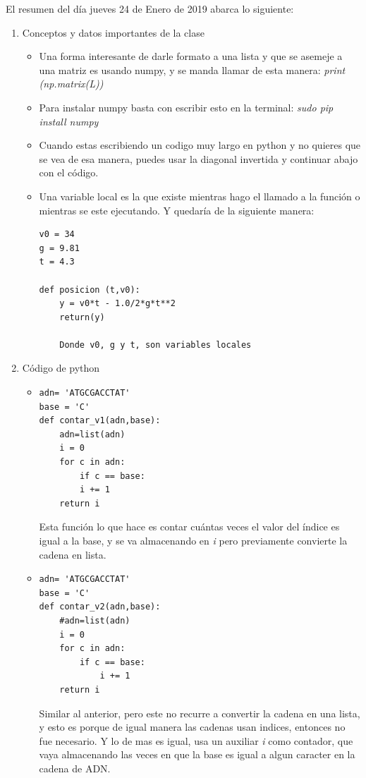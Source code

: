 \documentclass[letterpaper, 12pt,oneside]{article}
\begin{document}
	El resumen del día jueves 24 de Enero de 2019 abarca lo siguiente:
	\begin{enumerate}
		\item Conceptos y datos importantes de la clase
			\begin{itemize}
				\item Una forma interesante de darle formato a una lista y que se asemeje a una matriz es usando numpy, y se manda llamar de esta manera: \textit{print (np.matrix(L))}\\
				

				\item Para instalar numpy basta con escribir esto en la terminal: \textit{sudo pip install numpy}\\
				
				\item Cuando estas escribiendo un codigo muy largo en python y no quieres que se vea de esa manera, puedes usar la diagonal invertida y continuar abajo con el código.\\
				
				\item Una variable local es la que existe mientras hago el llamado a la función o mientras se este ejecutando. Y quedaría de la siguiente manera:  \begin{lstlisting}
v0 = 34
g = 9.81
t = 4.3

def posicion (t,v0):
    y = v0*t - 1.0/2*g*t**2
    return(y)

    Donde v0, g y t, son variables locales			
				\end{lstlisting}
				
				
				
			\end{itemize}
		
		
		
		\item Código de python
			\begin{itemize}
				\item \begin{lstlisting}
adn= 'ATGCGACCTAT'
base = 'C'				
def contar_v1(adn,base):
    adn=list(adn)
    i = 0
    for c in adn:
        if c == base:
        i += 1
    return i
				\end{lstlisting} Esta función lo que hace es contar cuántas veces el valor del índice es igual a la base, y se va almacenando en \textit{i} pero previamente convierte la cadena en lista.\\
				
				
				\item \begin{lstlisting}
adn= 'ATGCGACCTAT'
base = 'C'
def contar_v2(adn,base):
    #adn=list(adn)
    i = 0
    for c in adn:
        if c == base:
            i += 1
    return i
				\end{lstlisting} Similar al anterior, pero este no recurre a convertir la cadena en una lista, y esto es porque de igual manera las cadenas usan indices, entonces no fue necesario. Y lo de mas es igual, usa un auxiliar \textit{i} como contador, que vaya almacenando las veces en que la base es igual a algun caracter en la cadena de ADN.\\
				

\end{itemize}
\end{enumerate}
\end{document}
